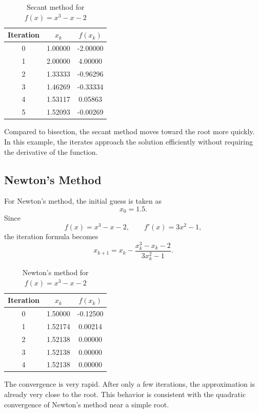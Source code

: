 \begin{table}[h!]
\centering
\caption{Secant method for \(f(x)=x^3-x-2\)}
\label{tab:secant_example}
\begin{tabular}{|c|c|c|}
\hline
Iteration & \(x_k\) & \(f(x_k)\) \\ \hline
0 & 1.00000 & -2.00000 \\ \hline
1 & 2.00000 & 4.00000 \\ \hline
2 & 1.33333 & -0.96296 \\ \hline
3 & 1.46269 & -0.33334 \\ \hline
4 & 1.53117 & 0.05863 \\ \hline
5 & 1.52093 & -0.00269 \\ \hline
\end{tabular}
\end{table}

Compared to bisection, the secant method moves toward the root more quickly. In this example, the iterates approach the solution efficiently without requiring the derivative of the function.

\subsection{Newton's Method}

For Newton's method, the initial guess is taken as
\[
x_0=1.5.
\]
Since
\[
f(x)=x^3-x-2, \qquad f'(x)=3x^2-1,
\]
the iteration formula becomes
\[
x_{k+1}=x_k-\frac{x_k^3-x_k-2}{3x_k^2-1}.
\]

\begin{table}[h!]
\centering
\caption{Newton's method for \(f(x)=x^3-x-2\)}
\label{tab:newton_example}
\begin{tabular}{|c|c|c|}
\hline
Iteration & \(x_k\) & \(f(x_k)\) \\ \hline
0 & 1.50000 & -0.12500 \\ \hline
1 & 1.52174 & 0.00214 \\ \hline
2 & 1.52138 & 0.00000 \\ \hline
3 & 1.52138 & 0.00000 \\ \hline
4 & 1.52138 & 0.00000 \\ \hline
\end{tabular}
\end{table}

The convergence is very rapid. After only a few iterations, the approximation is already very close to the root. This behavior is consistent with the quadratic convergence of Newton's method near a simple root.


